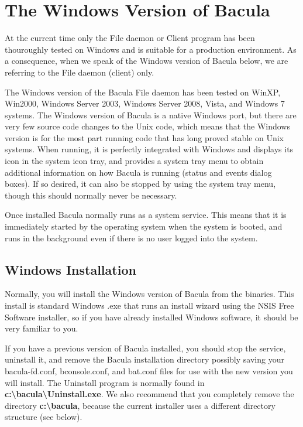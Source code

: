 
\chapter{The Windows Version of Bacula}
\label{Win32Chapter}

At the current time only the File daemon or Client program has
been thouroughly tested on Windows and is suitable for a
production environment. As a consequence, when we
speak of the Windows version of Bacula below, we are referring to
the File daemon (client) only. 

The Windows version of the Bacula File daemon has been tested on WinXP,
Win2000, Windows Server 2003, Windows Server 2008, Vista, and Windows 7
systems.  The Windows version of Bacula is a native Windows port, but there
are very few source code changes to the Unix code, which means that the
Windows version is for the most part running code that has long proved
stable on Unix systems.  When running, it is perfectly integrated with
Windows and displays its icon in the system icon tray, and provides a
system tray menu to obtain additional information on how Bacula is running
(status and events dialog boxes).  If so desired, it can also be stopped by
using the system tray menu, though this should normally never be necessary.

Once installed Bacula normally runs as a system service. This means that it is
immediately started by the operating system when the system is booted, and
runs in the background even if there is no user logged into the system. 

\section{Windows Installation}
\label{installation}

Normally, you will install the Windows version of Bacula from the binaries.
This install is standard Windows .exe that runs an install wizard using the
NSIS Free Software installer, so if you have already installed Windows
software, it should be very familiar to you. 

If you have a previous version of Bacula
installed, you should stop the service, uninstall it, and remove
the Bacula installation directory possibly saving your
bacula-fd.conf, bconsole.conf, and bat.conf files
for use with the new version you will install.  The Uninstall
program is normally found in {\bf c:\textbackslash{}bacula\textbackslash{}Uninstall.exe}.
We also recommend that you completely remove the directory
{\bf c:\textbackslash{}bacula}, because the current installer
uses a different directory structure (see below).

